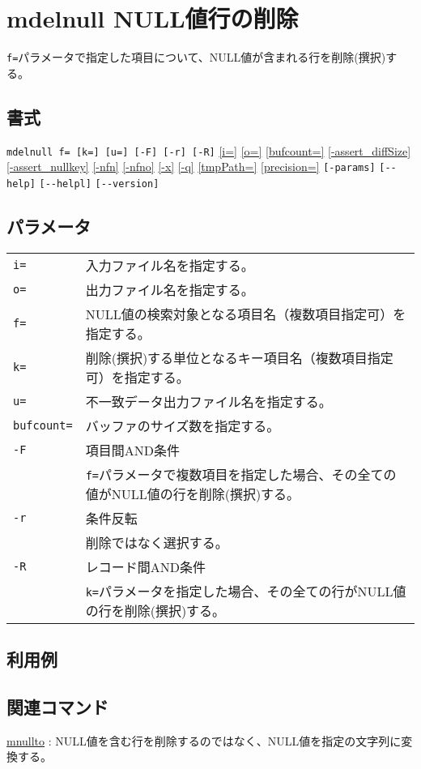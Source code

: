 
%

\section{mdelnull NULL値行の削除\label{sect:mdelnull}}
\verb|f=|パラメータで指定した項目について、NULL値が含まれる行を削除(撰択)する。\\

\subsection*{書式}
\verb|mdelnull f= [k=] [u=] [-F] [-r] [-R]| 
\hyperref[sect:option_i]{[i=]}
\hyperref[sect:option_o]{[o=]}
\hyperref[sect:option_bufcount]{[bufcount=]} 
\hyperref[sect:option_assert_diffSize]{[-assert\_diffSize]}
\hyperref[sect:option_assert_nullkey]{[-assert\_nullkey]}
\hyperref[sect:option_nfn]{[-nfn]} 
\hyperref[sect:option_nfno]{[-nfno]}  
\hyperref[sect:option_x]{[-x]}
\hyperref[sect:option_q]{[-q]}
\hyperref[sect:option_option_tmppath]{[tmpPath=]}
\hyperref[sect:option_precision]{[precision=]}
\verb|[-params]|
\verb|[--help]|
\verb|[--helpl]|
\verb|[--version]|\\

\subsection*{パラメータ}
\begin{table}[htbp]
{\small
\begin{tabular}{ll}
\verb|i=|    & 入力ファイル名を指定する。\\
\verb|o=|    & 出力ファイル名を指定する。\\
\verb|f=|    & NULL値の検索対象となる項目名（複数項目指定可）を指定する。 \\
\verb|k=|    & 削除(撰択)する単位となるキー項目名（複数項目指定可）を指定する。\\
\verb|u=|    & 不一致データ出力ファイル名を指定する。\\
\verb|bufcount=| & バッファのサイズ数を指定する。 \\
\verb|-F|    & 項目間AND条件\\
             & \verb|f=|パラメータで複数項目を指定した場合、その全ての値がNULL値の行を削除(撰択)する。\\
\verb|-r|    & 条件反転\\
             & 削除ではなく選択する。\\
\verb|-R|    & レコード間AND条件\\
             & \verb|k=|パラメータを指定した場合、その全ての行がNULL値の行を削除(撰択)する。\\
\end{tabular} 
}
\end{table} 

\subsection*{利用例}

\subsection*{関連コマンド}
\hyperref[sect:mnullto]{mnullto} : NULL値を含む行を削除するのではなく、NULL値を指定の文字列に変換する。

%
